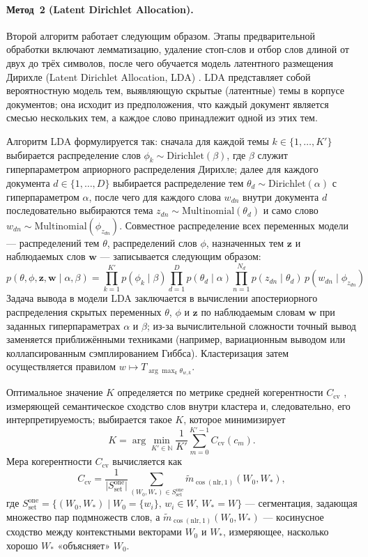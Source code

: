 \documentclass[14pt,a4paper]{article}
\begin{document}
\paragraph{Метод~2 (Latent Dirichlet Allocation).}
Второй алгоритм работает следующим образом. Этапы предварительной обработки включают лемматизацию, удаление стоп-слов и отбор слов длиной от двух до трёх символов, после чего обучается модель латентного размещения Дирихле (Latent Dirichlet Allocation, LDA) \cite{blei2003latent}. LDA представляет собой вероятностную модель тем, выявляющую скрытые (латентные) темы в корпусе документов; она исходит из предположения, что каждый документ является смесью нескольких тем, а каждое слово принадлежит одной из этих тем.

Алгоритм LDA формулируется так: сначала для каждой темы $k\in\{1,\ldots,K'\}$ выбирается распределение слов $\phi_k\sim\mathrm{Dirichlet}(\beta)$, где $\beta$ служит гиперпараметром априорного распределения Дирихле; далее для каждого документа $d\in\{1,\ldots,D\}$ выбирается распределение тем $\theta_d\sim\mathrm{Dirichlet}(\alpha)$ с гиперпараметром $\alpha$, после чего для каждого слова $w_{dn}$ внутри документа $d$ последовательно выбираются тема $z_{dn}\sim\mathrm{Multinomial}(\theta_d)$ и само слово $w_{dn}\sim\mathrm{Multinomial}(\phi_{z_{dn}})$. Совместное распределение всех переменных модели — распределений тем $\theta$, распределений слов $\phi$, назначенных тем $\mathbf z$ и наблюдаемых слов $\mathbf w$ — записывается следующим образом:
\begin{equation}
p(\theta, \phi, \mathbf{z}, \mathbf{w} \mid \alpha, \beta) = \prod_{k=1}^{K'} p(\phi_k \mid \beta) \prod_{d=1}^D p(\theta_d \mid \alpha) \prod_{n=1}^{N_d} p(z_{dn} \mid \theta_d)\, p(w_{dn} \mid \phi_{z_{dn}})
\end{equation}
Задача вывода в модели LDA заключается в вычислении апостериорного распределения скрытых переменных $\theta$, $\phi$ и $\mathbf z$ по наблюдаемым словам $\mathbf w$ при заданных гиперпараметрах $\alpha$ и $\beta$; из-за вычислительной сложности точный вывод заменяется приближёнными техниками (например, вариационным выводом или коллапсированным сэмплированием Гиббса). Кластеризация затем осуществляется правилом \(w\mapsto T_{\arg\max_{k}\theta_{w,k}}.\)

Оптимальное значение $K$ определяется по метрике средней когерентности $C_{\text{cv}}$ \cite{roder2015exploring}, измеряющей семантическое сходство слов внутри кластера и, следовательно, его интерпретируемость; выбирается такое $K$, которое минимизирует
\[
K=\arg\min_{K'\in\mathbb N}\frac{1}{K'}\sum_{m=0}^{K'-1}C_{\text{cv}}(c_m).
\]
Мера когерентности $C_{\text{cv}}$ вычисляется как
\[
C_{\text{cv}}=\frac{1}{\lvert S^{\text{one}}_{\text{set}}\rvert}\sum_{(W_0,W_*)\in S^{\text{one}}_{\text{set}}}\tilde m_{\cos(\mathrm{nlr},1)}(W_0,W_*),
\]
где $S^{\text{one}}_{\text{set}}=\{(W_0,W_*)\mid W_0=\{w_i\},\,w_i\in W,\,W_*=W\}$ — сегментация, задающая множество пар подмножеств слов, а $\tilde m_{\cos(\mathrm{nlr},1)}(W_0,W_*)$ — косинусное сходство между контекстными векторами $W_0$ и $W_*$, измеряющее, насколько хорошо $W_*$ «объясняет» $W_0$.
\end{document}
